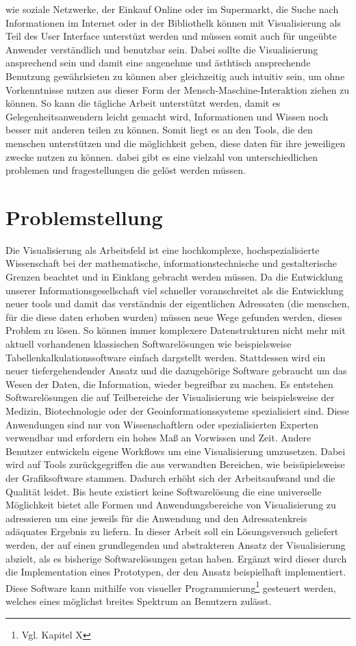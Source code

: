 \documentclass[a4paper, 12pt, DIVcalc, onepage, pdftex, headsepline, footsepline]{scrreprt}
\begin{document}
wie soziale Netzwerke, der Einkauf Online oder im Supermarkt, die Suche nach Informationen im
Internet oder in der Bibliothelk können mit Visualisierung als Teil des User Interface unterstüzt
werden und müssen somit auch für ungeübte Anwender verständlich und benutzbar sein. Dabei sollte
die Visualisierung ansprechend sein und damit eine angenehme und ästhtisch ansprechende Benutzung
gewährlsieten zu können aber gleichzeitig auch intuitiv sein, um ohne Vorkenntnisse nutzen aus
dieser Form der Mensch-Maschine-Interaktion ziehen zu können. So kann die tägliche Arbeit
unterstützt werden, damit es Gelegenheitsanwendern leicht gemacht wird, Informationen und
Wissen noch besser mit anderen teilen zu können. Somit liegt es an den Tools, die den menschen
unterstützen und die möglichkeit geben, diese daten für ihre jeweiligen zwecke nutzen zu können.
dabei gibt es eine vielzahl von unterschiedlichen problemen und fragestellungen die gelöst werden
müssen.

\section{Problemstellung}
Die Visualisierung als Arbeitsfeld ist eine hochkomplexe, hochspezialisierte Wissenschaft bei der
mathematische, informationstechnische und gestalterische Grenzen beachtet und in Einklang gebracht
werden müssen. Da die Entwicklung unserer Informationsgesellschaft viel schneller voranschreitet als
die Entwicklung neuer tools und damit das verständnis der eigentlichen Adressaten (die menschen, für
die diese daten erhoben wurden) müssen neue Wege gefunden werden, dieses Problem zu lösen. So können
immer komplexere Datenstrukturen nicht mehr mit aktuell vorhandenen klassischen Softwarelösungen wie 
beispielsweise Tabellenkalkulationssoftware
einfach dargstellt werden. Stattdessen wird ein neuer tiefergehendender Ansatz und die dazugehörige
Software gebraucht um das Wesen der Daten, die Information, wieder begreifbar zu machen.
Es entstehen Softwarelösungen die auf Teilbereiche der Visualisierung wie beispielsweise der Medizin,
Biotechnologie oder der Geoinformationssysteme spezialisiert sind. Diese Anwendungen sind nur von
Wissenschaftlern oder spezialisierten Experten verwendbar und erfordern ein hohes Maß an Vorwissen
und Zeit.
Andere Benutzer entwickeln eigene Workflows um eine Visualisierung umzusetzen.
Dabei wird auf Tools zurückgegriffen die aus verwandten Bereichen, wie beisüpielsweise der
Grafiksoftware stammen.
Dadurch erhöht sich der Arbeitsaufwand und die Qualität leidet. Bis heute existiert keine
Softwarelösung die eine universelle Möglichkeit bietet alle Formen und Anwendungsbereiche von
Visualisierung zu adressieren um eine jeweils für die Anwendung und den Adressatenkreis adäquates
Ergebnis zu liefern.
In dieser Arbeit soll ein Lösungsversuch geliefert werden, der auf einen grundlegenden und
abstrakteren Ansatz der Visualisierung abzielt, als es bisherige Softwarelösungen getan haben.
Ergänzt wird dieser durch die Implementation eines Prototypen, der den Ansatz beispielhaft
implementiert.
Diese Software kann mithilfe von visueller Programmierung\footnote{Vgl. Kapitel X} gesteuert werden,
welches eines möglichst breites Spektrum an Benutzern zulässt. 
\end{document}
